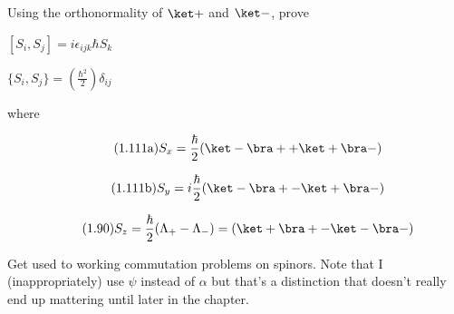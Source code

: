 \begin{question}

  Using the orthonormality of $\ket +$ and $\ket -$, prove

  \begin{questionpart}
    $[S_i, S_j] = i \epsilon_{ijk} \hbar S_k$
  \end{questionpart}

  \begin{questionpart}
    $\{S_i, S_j\} = \left( \frac{\hbar^2}{2} \right) \delta_{ij}$
  \end{questionpart}

  \noindent where

  \begin{equation}
    \tag{1.111a}
    S_x = \frac \hbar 2 (\ket - \bra + + \ket + \bra -)
  \end{equation}

  \begin{equation}
    \tag{1.111b}
    S_y = i \frac \hbar 2 (\ket - \bra + - \ket + \bra -)
  \end{equation}
  
  \begin{equation}
    \tag{1.90}
    S_z = \frac \hbar 2 (\Lambda_+ - \Lambda_-) = (\ket + \bra + - \ket - \bra -)
  \end{equation}
\end{question}

\begin{purpose}
  Get used to working commutation problems on spinors.  Note that I
  (inappropriately) use $\psi$ instead of $\alpha$ but that's a
  distinction that doesn't really end up mattering until later in the
  chapter.
\end{purpose}


